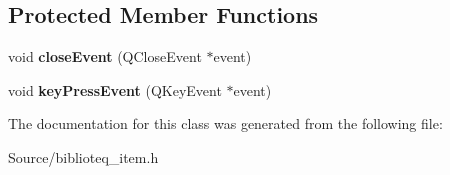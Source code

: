 \subsection*{Protected Member Functions}
\begin{DoxyCompactItemize}
\item 
void {\bfseries close\+Event} (Q\+Close\+Event $\ast$event)\hypertarget{classbiblioteq__item__working__dialog_a4e79bf3607bf6190d2a5ab1f15100bf6}{}\label{classbiblioteq__item__working__dialog_a4e79bf3607bf6190d2a5ab1f15100bf6}

\item 
void {\bfseries key\+Press\+Event} (Q\+Key\+Event $\ast$event)\hypertarget{classbiblioteq__item__working__dialog_a64373b8f8319ad379ae7309f83ff61d4}{}\label{classbiblioteq__item__working__dialog_a64373b8f8319ad379ae7309f83ff61d4}

\end{DoxyCompactItemize}


The documentation for this class was generated from the following file\+:\begin{DoxyCompactItemize}
\item 
Source/biblioteq\+\_\+item.\+h\end{DoxyCompactItemize}
